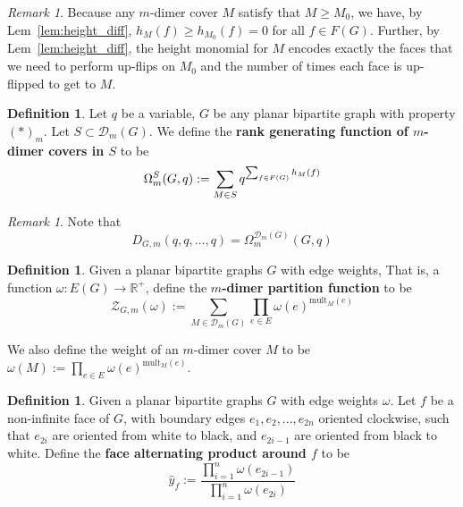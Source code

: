 \documentclass[11pt]{amsart}
\theoremstyle{definition}
\newtheorem{defn}[thm]{Definition}
\theoremstyle{remark}
\newtheorem{rem}[thm]{Remark}
\numberwithin{equation}{section}
\begin{document}
\begin{rem}
    Because any $m$-dimer cover $M$ satisfy that $M\geq M_0$, we have, by Lem~\ref{lem:height_diff}, $h_M(f)\geq h_{M_0}(f) = 0$ for all $f\in F(G)$. Further, by Lem~\ref{lem:height_diff}, the height monomial for $M$ encodes exactly the faces that we need to perform up-flips on $M_0$ and the number of times each face is up-flipped to get to $M$. 
\end{rem}

\begin{defn}
    Let $q$ be a variable, $G$ be any planar bipartite graph with property $(*)_m$. Let $S\subset \mathcal{D}_{m}(G)$. We define the \textbf{rank generating function of $m$-dimer covers in $S$} to be
    \begin{equation}
        \Omega^{S}_m(G,q):= \sum_{M\in S}q^{\sum_{f\in F(G)}h_M(f)}\\
    \end{equation}
\end{defn}

\begin{rem}\label{rem: rank_gen_equals_face_poly}
    Note that $$D_{G,m}(q,q,...,q) = \Omega^{\mathcal{D}_{m}(G)}_{m}(G,q)$$
\end{rem}
\begin{defn}
    Given a planar bipartite graphs $G$ with edge weights, That is, a function $\omega: E(G)\rightarrow \mathbb{R}^+$, define the \textbf{$m$-dimer partition function} to be $$\mathcal{Z}_{G,m}(\omega) := \sum_{M\in \mathcal{D}_m(G)}\prod_{e\in E}\omega(e)^{\text{mult}_M(e)}$$

    We also define the weight of an $m$-dimer cover $M$ to be $\omega(M):= \displaystyle\prod_{e\in E}\omega(e)^{\text{mult}_M(e)}$.
\end{defn}

\begin{defn}\label{def: face_alt_prod}
    Given a planar bipartite graphs $G$ with edge weights $\omega$. Let $f$ be a non-infinite face of $G$, with boundary edges $e_1,e_2,...,e_{2n}$ oriented clockwise, such that $e_{2i}$ are oriented from white to black, and $e_{2i-1}$ are oriented from black to white. Define the \textbf{face alternating product around $f$} to be $$\hat{y}_f := \frac{\prod^{n}_{i=1}\omega(e_{2i-1})}{\prod^{n}_{i=1}\omega(e_{2i})}$$
\end{defn}
\end{document}
